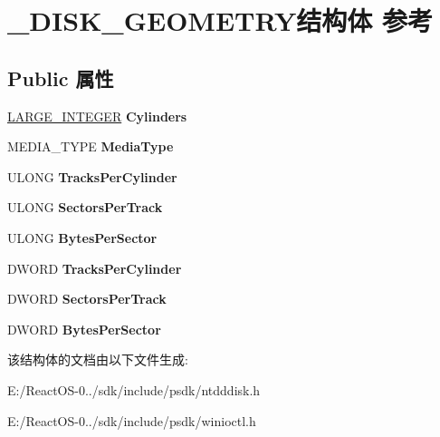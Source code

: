 \hypertarget{struct___d_i_s_k___g_e_o_m_e_t_r_y}{}\section{\+\_\+\+D\+I\+S\+K\+\_\+\+G\+E\+O\+M\+E\+T\+R\+Y结构体 参考}
\label{struct___d_i_s_k___g_e_o_m_e_t_r_y}
\subsection*{Public 属性}
\begin{DoxyCompactItemize}
\item 
\mbox{\label{struct___d_i_s_k___g_e_o_m_e_t_r_y_a1a745d36cc9de5d3a4eef9333b16e91a}} 
\hyperlink{union___l_a_r_g_e___i_n_t_e_g_e_r}{L\+A\+R\+G\+E\+\_\+\+I\+N\+T\+E\+G\+ER} {\bfseries Cylinders}
\item 
\mbox{\label{struct___d_i_s_k___g_e_o_m_e_t_r_y_a1425772b6a3b7a0f3172db2bf1239797}} 
M\+E\+D\+I\+A\+\_\+\+T\+Y\+PE {\bfseries Media\+Type}
\item 
\mbox{\label{struct___d_i_s_k___g_e_o_m_e_t_r_y_a726f9a78cf7e4bfafc218204da1809bf}} 
U\+L\+O\+NG {\bfseries Tracks\+Per\+Cylinder}
\item 
\mbox{\label{struct___d_i_s_k___g_e_o_m_e_t_r_y_ac7ad7756bddb9dbdd73c10b3b3540244}} 
U\+L\+O\+NG {\bfseries Sectors\+Per\+Track}
\item 
\mbox{\label{struct___d_i_s_k___g_e_o_m_e_t_r_y_ad2c499b6905b081f4bed51d5934d226d}} 
U\+L\+O\+NG {\bfseries Bytes\+Per\+Sector}
\item 
\mbox{\label{struct___d_i_s_k___g_e_o_m_e_t_r_y_a726f9a78cf7e4bfafc218204da1809bf}} 
D\+W\+O\+RD {\bfseries Tracks\+Per\+Cylinder}
\item 
\mbox{\label{struct___d_i_s_k___g_e_o_m_e_t_r_y_ac7ad7756bddb9dbdd73c10b3b3540244}} 
D\+W\+O\+RD {\bfseries Sectors\+Per\+Track}
\item 
\mbox{\label{struct___d_i_s_k___g_e_o_m_e_t_r_y_ad2c499b6905b081f4bed51d5934d226d}} 
D\+W\+O\+RD {\bfseries Bytes\+Per\+Sector}
\end{DoxyCompactItemize}


该结构体的文档由以下文件生成\+:\begin{DoxyCompactItemize}
\item 
E\+:/\+React\+O\+S-\/0../sdk/include/psdk/ntdddisk.\+h\item 
E\+:/\+React\+O\+S-\/0../sdk/include/psdk/winioctl.\+h\end{DoxyCompactItemize}
